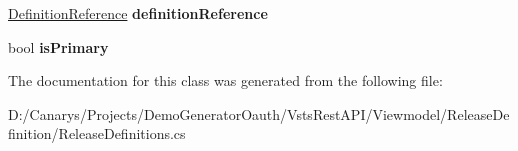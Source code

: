 \begin{DoxyCompactItemize}
\mbox{\hyperlink{class_vsts_rest_a_p_i_1_1_viewmodel_1_1_release_definition_1_1_release_definitions_1_1_definition_reference}{Definition\+Reference}} {\bfseries definition\+Reference}
\item 
\mbox{\label{class_vsts_rest_a_p_i_1_1_viewmodel_1_1_release_definition_1_1_release_definitions_1_1_artifact_a538e6ded1965d3cf0c5cc4248dfe389c}} 
bool {\bfseries is\+Primary}
\end{DoxyCompactItemize}


The documentation for this class was generated from the following file\+:\begin{DoxyCompactItemize}
\item 
D\+:/\+Canarys/\+Projects/\+Demo\+Generator\+Oauth/\+Vsts\+Rest\+A\+P\+I/\+Viewmodel/\+Release\+Definition/Release\+Definitions.\+cs\end{DoxyCompactItemize}
